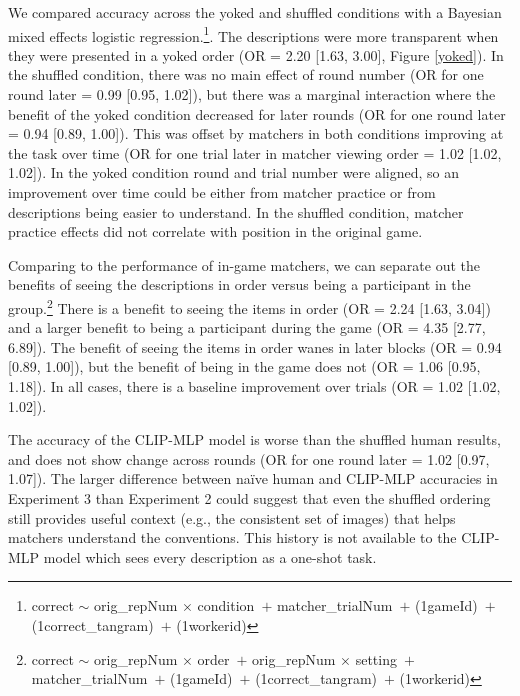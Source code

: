 \documentclass[10pt, letterpaper]{article}
\begin{document}
We compared accuracy across the yoked and shuffled conditions with a
Bayesian mixed effects logistic regression.\footnote{correct \({\sim}\)
  orig\_repNum \({\times}\) condition~\({+}\) matcher\_trialNum~\({+}\)
  (1\textbar gameId)~\({+}\) (1\textbar correct\_tangram)~\({+}\)
  (1\textbar workerid)}. The descriptions were more transparent when
they were presented in a yoked order (OR = 2.20 {[}1.63, 3.00{]}, Figure
\ref{yoked}). In the shuffled condition, there was no main effect of
round number (OR for one round later = 0.99 {[}0.95, 1.02{]}), but there
was a marginal interaction where the benefit of the yoked condition
decreased for later rounds (OR for one round later = 0.94 {[}0.89,
1.00{]}). This was offset by matchers in both conditions improving at
the task over time (OR for one trial later in matcher viewing order =
1.02 {[}1.02, 1.02{]}). In the yoked condition round and trial number
were aligned, so an improvement over time could be either from matcher
practice or from descriptions being easier to understand. In the
shuffled condition, matcher practice effects did not correlate with
position in the original game.

Comparing to the performance of in-game matchers, we can separate out
the benefits of seeing the descriptions in order versus being a
participant in the group.\footnote{correct \({\sim}\) orig\_repNum
  \({\times}\) order~\({+}\) orig\_repNum \({\times}\) setting~\({+}\)
  matcher\_trialNum~\({+}\) (1\textbar gameId)~\({+}\)
  (1\textbar correct\_tangram)~\({+}\) (1\textbar workerid)} There is a
benefit to seeing the items in order (OR = 2.24 {[}1.63, 3.04{]}) and a
larger benefit to being a participant during the game (OR = 4.35
{[}2.77, 6.89{]}). The benefit of seeing the items in order wanes in
later blocks (OR = 0.94 {[}0.89, 1.00{]}), but the benefit of being in
the game does not (OR = 1.06 {[}0.95, 1.18{]}). In all cases, there is a
baseline improvement over trials (OR = 1.02 {[}1.02, 1.02{]}).

The accuracy of the CLIP-MLP model is worse than the shuffled human
results, and does not show change across rounds (OR for one round later
= 1.02 {[}0.97, 1.07{]}). The larger difference between naïve human and
CLIP-MLP accuracies in Experiment 3 than Experiment 2 could suggest that
even the shuffled ordering still provides useful context (e.g., the
consistent set of images) that helps matchers understand the
conventions. This history is not available to the CLIP-MLP model which
sees every description as a one-shot task.
\end{document}
